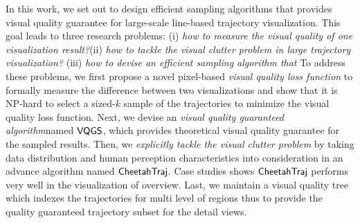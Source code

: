 In this work, we set out to design efficient sampling algorithms that provides visual quality guarantee for large-scale line-based trajectory visualization. This goal leads to three research problems: (i) \emph{how to measure the visual quality of one visualization result?}(ii) \emph{how to tackle the visual clutter problem in large trajectory visualization?} 
(iii) \emph{how to devise an efficient sampling algorithm that }  
To address these problems, we first propose a novel pixel-based \textit{visual quality loss function} to formally measure the difference between two visualizations and show that it is NP-hard to select a sized-$k$ sample of the trajectories to minimize the visual quality loss function. Next, we devise an \textit{visual quality guaranteed algorithm}named $\mathsf{VQGS}$, which provides theoretical visual quality guarantee for the sampled results. Then, we \textit{explicitly tackle the visual clutter problem} by taking data distribution and human perception characteristics into consideration in an advance algorithm named $\mathsf{CheetahTraj}$. Case studies shows $\mathsf{CheetahTraj}$ performs very well in the visualization of overview. Last, we maintain a visual quality tree which indexes the trajectories for multi level of regions thus to provide the quality guaranteed trajectory subset for the detail views. 


